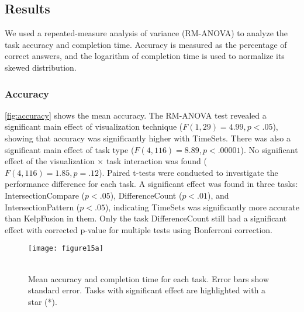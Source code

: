 \subsection{Results}
We used a repeated-measure analysis of variance (RM-ANOVA) to analyze the task accuracy and completion time. Accuracy is measured as the percentage of correct answers, and the logarithm of completion time is used to normalize its skewed distribution.

\subsubsection{Accuracy}
\autoref{fig:accuracy} shows the mean accuracy. The RM-ANOVA test revealed a significant main effect of visualization technique ($F(1,29)=4.99, p<.05$), showing that accuracy was significantly higher with TimeSets. There was also a significant main effect of task type ($F(4,116)=8.89, p<.00001$). No significant effect of the visualization $\times$ task interaction was found ($F(4,116)=1.85, p=.12$). Paired t-tests were conducted to investigate the performance difference for each task. A significant effect was found in three tasks: IntersectionCompare ($p<.05$), DifferenceCount ($p<.01$), and IntersectionPattern ($p<.05$), indicating TimeSets was significantly more accurate than KelpFusion in them. Only the task DifferenceCount still had a significant effect with corrected p-value for multiple tests using Bonferroni correction.

\begin{figure}[!htb]
	\centering
	 {\texttt{[image: figure15a]}} \\
	\\
	\caption[Mean accuracy and completion time for each task]{Mean accuracy and completion time for each task. Error bars show standard error. Tasks with significant effect are highlighted with a star (*).}
\end{figure}

